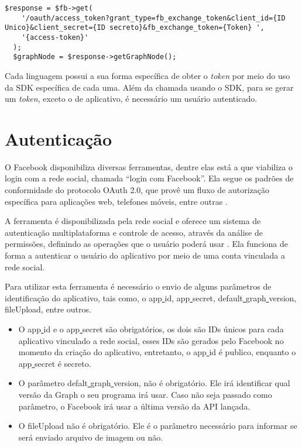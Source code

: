 \begin{lstlisting}[caption={Obtendo Token Infinito},label={lst:tokeninfinito}]
  $response = $fb->get(
    '/oauth/access_token?grant_type=fb_exchange_token&client_id={ID Unico}&client_secret={ID secreto}&fb_exchange_token={Token} ',
    '{access-token}'
  );
  $graphNode = $response->getGraphNode();
\end{lstlisting}

Cada linguagem possui a sua forma específica de obter o \textit{token} por meio do uso da SDK específica de cada uma. Além da chamada usando o SDK, para se gerar um \textit{token}, exceto o de aplicativo, é necessário um usuário autenticado.

\section{Autenticação}
O Facebook disponibiliza diversas ferramentas, dentre elas está a que viabiliza o login com a rede social, chamada ``login com Facebook''. Ela segue os padrões de conformidade do protocolo OAuth 2.0, que provê um fluxo de autorização específica para aplicações web, telefones móveis, entre outras \cite{oauth2018}. 

A ferramenta é disponibilizada pela rede social e oferece um sistema de autenticação multiplataforma e controle de acesso, através da análise de permissões, definindo as operações que o usuário poderá usar \cite{facebook2018c}. Ela funciona de forma a autenticar o usuário do aplicativo por meio de uma conta vinculada a rede social.

Para utilizar esta ferramenta é necessário o envio de alguns parâmetros de identificação do aplicativo, tais como, o app\underline{{ }}id, app\underline{{ }}secret, default\underline{{ }}graph\underline{{ }}version, fileUpload, entre outros.

\begin{itemize}
\item O app\underline{{ }}id e o app\underline{{ }}secret são obrigatórios, os dois são IDs únicos para cada aplicativo vinculado a rede social, esses IDs são gerados pelo Facebook no momento da criação do aplicativo, entretanto, o app\underline{{ }}id é publico, enquanto o app\underline{{ }}secret é secreto.

\item O parâmetro defalt\underline{{ }}graph\underline{{ }}version, não é obrigatório. Ele irá identificar qual versão da Graph o seu programa irá usar. Caso não seja passado como parâmetro, o Facebook irá usar a última versão da API lançada.

\item O fileUpload não é obrigatório. Ele é o parâmetro necessário para informar se será enviado arquivo de imagem ou não.
\end{itemize}

